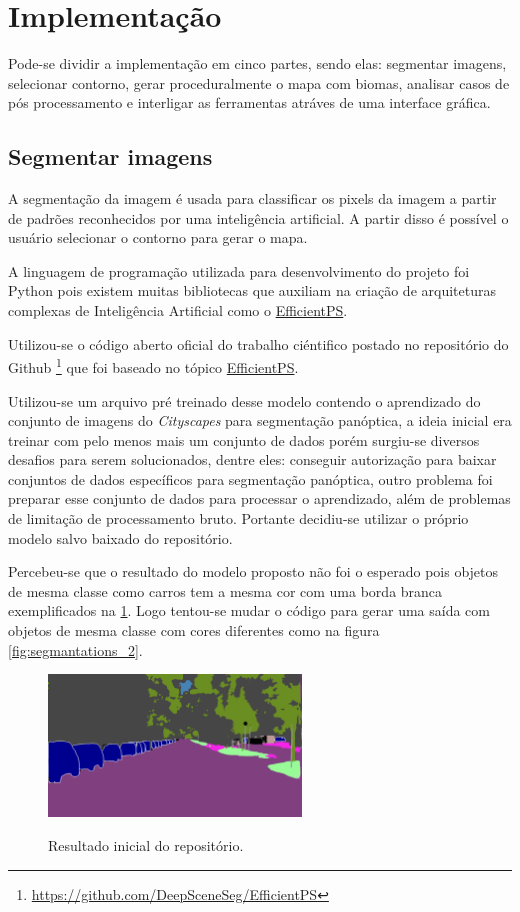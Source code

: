 \section{Implementação}

Pode-se dividir a implementação em cinco partes, sendo elas: segmentar imagens, selecionar contorno, gerar proceduralmente o mapa com biomas, analisar casos de pós processamento e interligar as ferramentas atráves de uma interface gráfica.

\subsection{Segmentar imagens}

A segmentação da imagem é usada para classificar os pixels da imagem a partir de padrões reconhecidos por uma inteligência artificial. A partir disso é possível o usuário selecionar o contorno para gerar o mapa.

A linguagem de programação utilizada para desenvolvimento do projeto foi Python pois existem muitas bibliotecas que auxiliam na criação de arquiteturas complexas de Inteligência Artificial como o \hyperref[sec:EfficientPS]{EfficientPS}.

Utilizou-se o código aberto oficial do trabalho ciéntifico postado no repositório do Github \footnote{\url{https://github.com/DeepSceneSeg/EfficientPS}} que foi baseado no tópico \hyperref[sec:EfficientPS]{EfficientPS}.

Utilizou-se um arquivo pré treinado desse modelo contendo o aprendizado do conjunto de imagens do \textit{Cityscapes} para segmentação panóptica, a ideia inicial era treinar com pelo menos mais um conjunto de dados porém surgiu-se diversos desafios para serem solucionados, dentre eles: conseguir autorização para baixar conjuntos de dados específicos para segmentação panóptica, outro problema foi preparar esse conjunto de dados para processar o aprendizado, além de problemas de limitação de processamento bruto. Portante decidiu-se utilizar o próprio modelo salvo baixado do repositório.

Percebeu-se que o resultado do modelo proposto não foi o esperado pois objetos de mesma classe como carros tem a mesma cor com uma borda branca exemplificados na \cref{fig:resultado_inicial}. Logo tentou-se mudar o código para gerar uma saída com objetos de mesma classe com cores diferentes como na figura \cref{fig:segmantations_2}.

\begin{figure}[!ht]
	\centering
    \caption{Resultado inicial do repositório.}
	\includegraphics[width=0.6\textwidth]{figures/resultado_primario.png}
	\label{fig:resultado_inicial}
\end{figure}

